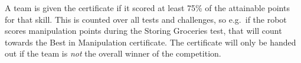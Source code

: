 A team is given the certificate if it scored at least 75\% of the attainable points for that skill.
This is counted over all tests and challenges, so e.g.~if the robot scores manipulation points during the Storing Groceries test, that will count towards the Best in Manipulation certificate.
The certificate will only be handed out if the team is \emph{not} the overall winner of the competition.
